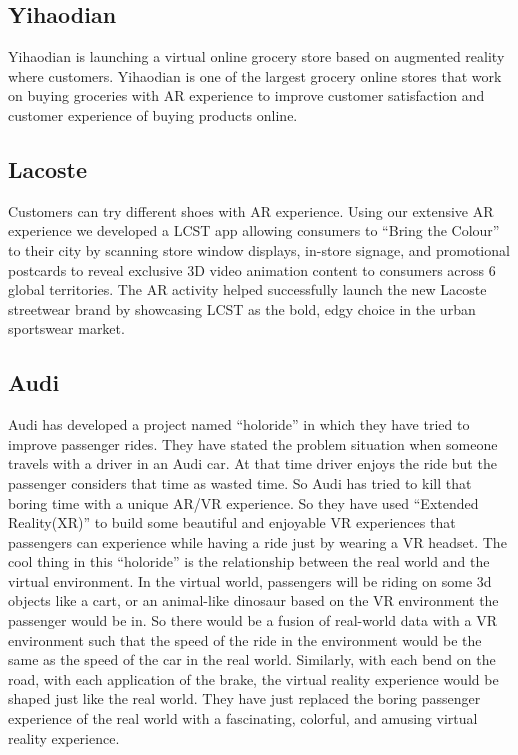 \subsection{Yihaodian}
Yihaodian is launching a virtual online grocery store based on augmented reality where customers. Yihaodian is one of the largest grocery online stores that work on buying groceries with AR experience to improve customer satisfaction and customer experience of buying products online.
\cite{Yihaodian}
\subsection{Lacoste}
\justifying
Customers can try different shoes with AR experience.
Using our extensive AR experience we developed a LCST app allowing consumers to “Bring the Colour” to their city by scanning store window displays, in-store signage, and promotional postcards to reveal exclusive 3D video animation content to consumers across 6 global territories. The AR activity helped successfully launch the new Lacoste streetwear brand by showcasing LCST as the bold, edgy choice in the urban sportswear market.\cite{Lacoste}
\subsection{Audi}
	Audi has developed a project named “holoride” in which they have tried to improve passenger rides. They have stated the problem situation when someone travels with a driver in an Audi car. At that time driver enjoys the ride but the passenger considers that time as wasted time. So Audi has tried to kill that boring time with a unique AR/VR experience. So they have used “Extended Reality(XR)” to build some beautiful and enjoyable VR experiences that passengers can experience while having a ride just by wearing a VR headset. 
The cool thing in this “holoride” is the relationship between the real world and the virtual environment. In the virtual world, passengers will be riding on some 3d objects like a cart, or an animal-like dinosaur based on the VR environment the passenger would be in. So there would be a fusion of real-world data with a VR environment such that the speed of the ride in the environment would be the same as the speed of the car in the real world. Similarly, with each bend on the road, with each application of the brake, the virtual reality experience would be shaped just like the real world. 
They have just replaced the boring passenger experience of the real world with a fascinating, colorful, and amusing virtual reality experience. \cite{Audi}

